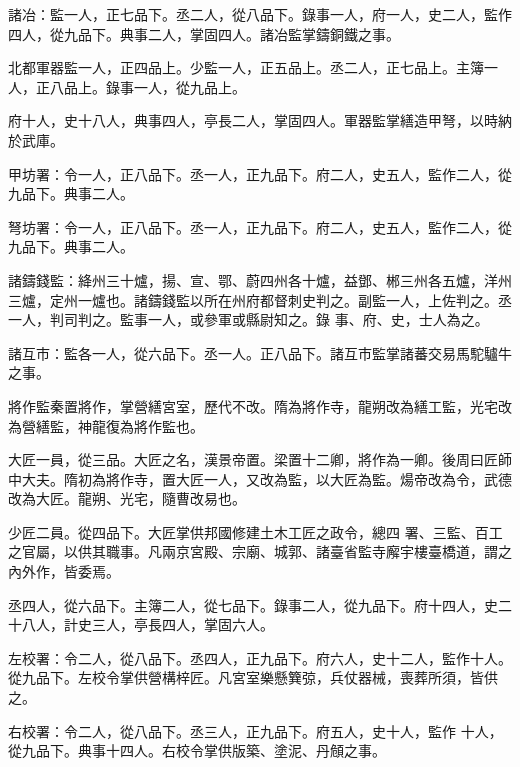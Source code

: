\begin{pinyinscope}
 諸冶：監一人，正七品下。丞二人，從八品下。錄事一人，府一人，史二人，監作四人，從九品下。典事二人，掌固四人。諸冶監掌鑄銅鐵之事。



 北都軍器監一人，正四品上。少監一人，正五品上。丞二人，正七品上。主簿一人，正八品上。錄事一人，從九品上。



 府十人，史十八人，典事四人，亭長二人，掌固四人。軍器監掌繕造甲弩，以時納
 於武庫。



 甲坊署：令一人，正八品下。丞一人，正九品下。府二人，史五人，監作二人，從九品下。典事二人。



 弩坊署：令一人，正八品下。丞一人，正九品下。府二人，史五人，監作二人，從九品下。典事二人。



 諸鑄錢監：絳州三十爐，揚、宣、鄂、蔚四州各十爐，益鄧、郴三州各五爐，洋州三爐，定州一爐也。諸鑄錢監以所在州府都督刺史判之。副監一人，上佐判之。丞一人，判司判之。監事一人，或參軍或縣尉知之。錄
 事、府、史，士人為之。



 諸互市：監各一人，從六品下。丞一人。正八品下。諸互市監掌諸蕃交易馬駝驢牛之事。



 將作監秦置將作，掌營繕宮室，歷代不改。隋為將作寺，龍朔改為繕工監，光宅改為營繕監，神龍復為將作監也。



 大匠一員，從三品。大匠之名，漢景帝置。梁置十二卿，將作為一卿。後周曰匠師中大夫。隋初為將作寺，置大匠一人，又改為監，以大匠為監。煬帝改為令，武德改為大匠。龍朔、光宅，隨曹改易也。



 少匠二員。從四品下。大匠掌供邦國修建土木工匠之政令，總四
 署、三監、百工之官屬，以供其職事。凡兩京宮殿、宗廟、城郭、諸臺省監寺廨宇樓臺橋道，謂之內外作，皆委焉。



 丞四人，從六品下。主簿二人，從七品下。錄事二人，從九品下。府十四人，史二十八人，計史三人，亭長四人，掌固六人。



 左校署：令二人，從八品下。丞四人，正九品下。府六人，史十二人，監作十人。從九品下。左校令掌供營構梓匠。凡宮室樂懸簨弶，兵仗器械，喪葬所須，皆供之。



 右校署：令二人，從八品下。丞三人，正九品下。府五人，史十人，監作
 十人，從九品下。典事十四人。右校令掌供版築、塗泥、丹頠之事。




\end{pinyinscope}
